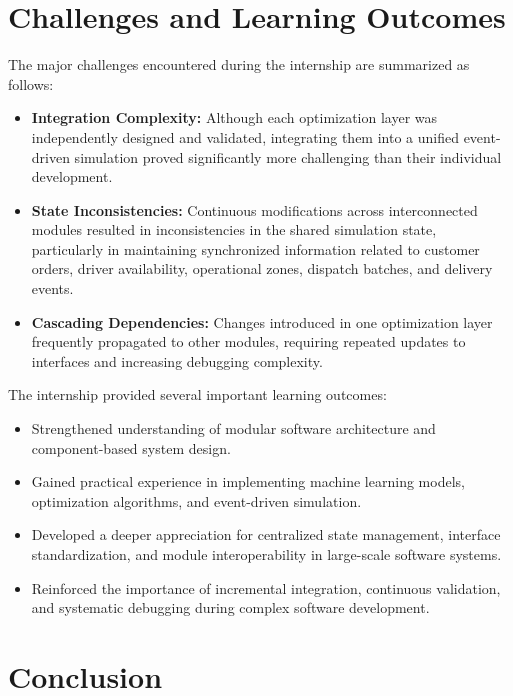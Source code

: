 \documentclass{article}
\begin{document}
\section{Challenges and Learning Outcomes}
\label{sec:challenges_and_learning_outcomes}

The major challenges encountered during the internship are summarized as follows:

\begin{itemize}
    \item \textbf{Integration Complexity:} Although each optimization layer was independently designed and validated, integrating them into a unified event-driven simulation proved significantly more challenging than their individual development.
    \item \textbf{State Inconsistencies:} Continuous modifications across interconnected modules resulted in inconsistencies in the shared simulation state, particularly in maintaining synchronized information related to customer orders, driver availability, operational zones, dispatch batches, and delivery events.
    \item \textbf{Cascading Dependencies:} Changes introduced in one optimization layer frequently propagated to other modules, requiring repeated updates to interfaces and increasing debugging complexity.
\end{itemize}

The internship provided several important learning outcomes:

\begin{itemize}
    \item Strengthened understanding of modular software architecture and component-based system design.
    \item Gained practical experience in implementing machine learning models, optimization algorithms, and event-driven simulation.
    \item Developed a deeper appreciation for centralized state management, interface standardization, and module interoperability in large-scale software systems.
    \item Reinforced the importance of incremental integration, continuous validation, and systematic debugging during complex software development.
\end{itemize}


\section{Conclusion}
\end{document}
